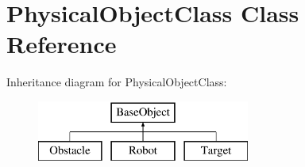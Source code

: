 \hypertarget{classBaseObject}{\section{Physical\-Object\-Class Class Reference}
\label{classBaseObject}
}
Inheritance diagram for Physical\-Object\-Class\-:\begin{figure}[H]
\begin{center}
\leavevmode
\includegraphics[height=2.000000cm]{classBaseObject}
\end{center}
\end{figure}
